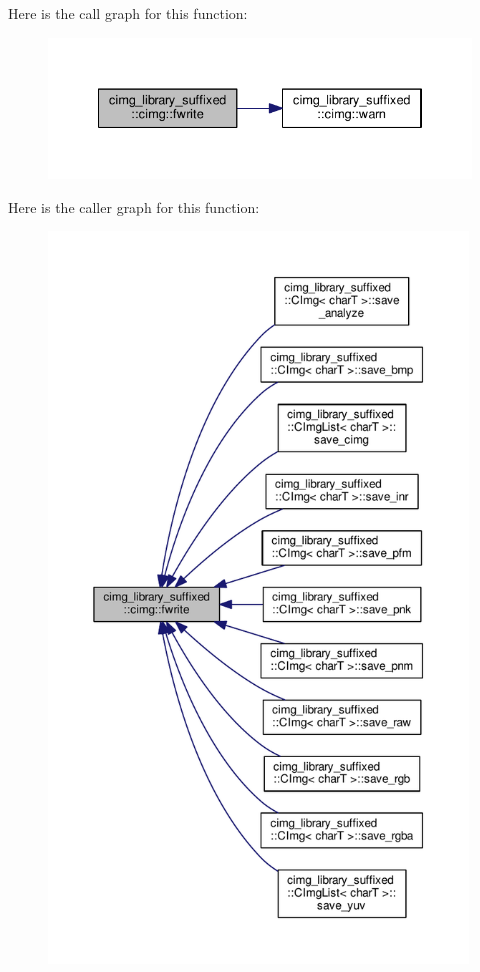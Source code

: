 Here is the call graph for this function\+:
\nopagebreak
\begin{figure}[H]
\begin{center}
\leavevmode
\includegraphics[width=334pt]{d4/d9b/namespacecimg__library__suffixed_1_1cimg_ad44a7e96cd1e9cdef83f4ffe235dd1fb_cgraph}
\end{center}
\end{figure}
Here is the caller graph for this function\+:
\nopagebreak
\begin{figure}[H]
\begin{center}
\leavevmode
\includegraphics[height=550pt]{d4/d9b/namespacecimg__library__suffixed_1_1cimg_ad44a7e96cd1e9cdef83f4ffe235dd1fb_icgraph}
\end{center}
\end{figure}
